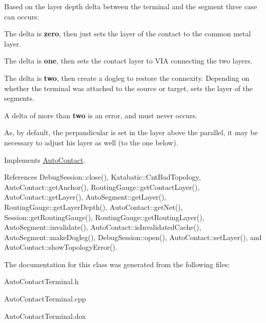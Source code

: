 Based on the layer depth delta between the terminal and the segment three case can occurs\-:
\begin{DoxyItemize}
\item The delta is {\bfseries zero}, then just sets the layer of the contact to the common metal layer.
\item The delta is {\bfseries one}, then sets the contact layer to V\-I\-A connecting the two layers.
\item The delta is {\bfseries two}, then create a dogleg to restore the connexity. Depending on whether the terminal was attached to the source or target, sets the layer of the segments.
\item A delta of more than {\bfseries two} is an error, and must never occurs.
\end{DoxyItemize}

As, by default, the perpandicular is set in the layer above the parallel, it may be necessary to adjust his layer as well (to the one below).

 

Implements \hyperlink{classKatabatic_1_1AutoContact_a690764ddc997fe9766a79c4b8e0c3e2f}{Auto\-Contact}.



References Debug\-Session\-::close(), Katabatic\-::\-Cnt\-Bad\-Topology, Auto\-Contact\-::get\-Anchor(), Routing\-Gauge\-::get\-Contact\-Layer(), Auto\-Contact\-::get\-Layer(), Auto\-Segment\-::get\-Layer(), Routing\-Gauge\-::get\-Layer\-Depth(), Auto\-Contact\-::get\-Net(), Session\-::get\-Routing\-Gauge(), Routing\-Gauge\-::get\-Routing\-Layer(), Auto\-Segment\-::invalidate(), Auto\-Contact\-::is\-Invalidated\-Cache(), Auto\-Segment\-::make\-Dogleg(), Debug\-Session\-::open(), Auto\-Contact\-::set\-Layer(), and Auto\-Contact\-::show\-Topology\-Error().



The documentation for this class was generated from the following files\-:\begin{DoxyCompactItemize}
\item 
Auto\-Contact\-Terminal.\-h\item 
Auto\-Contact\-Terminal.\-cpp\item 
Auto\-Contact\-Terminal.\-dox\end{DoxyCompactItemize}

